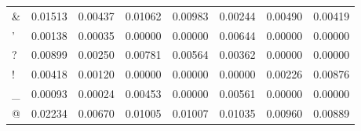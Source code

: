 \begin{tabularx}{\textwidth}{X|c|c|c|c|c|c|c}
\&  & 0.01513 &  0.00437 &  0.01062 &  0.00983 &  0.00244 &  0.00490 &  0.00419  \\
'   & 0.00138 &  0.00035 &  0.00000 &  0.00000 &  0.00644 &  0.00000 &  0.00000  \\
?   & 0.00899 &  0.00250 &  0.00781 &  0.00564 &  0.00362 &  0.00000 &  0.00000  \\
!   & 0.00418 &  0.00120 &  0.00000 &  0.00000 &  0.00000 &  0.00226 &  0.00876  \\
\_  & 0.00093 &  0.00024 &  0.00453 &  0.00000 &  0.00561 &  0.00000 &  0.00000  \\
@   & 0.02234 &  0.00670 &  0.01005 &  0.01007 &  0.01035 &  0.00960 &  0.00889  \\
\end{tabularx}

